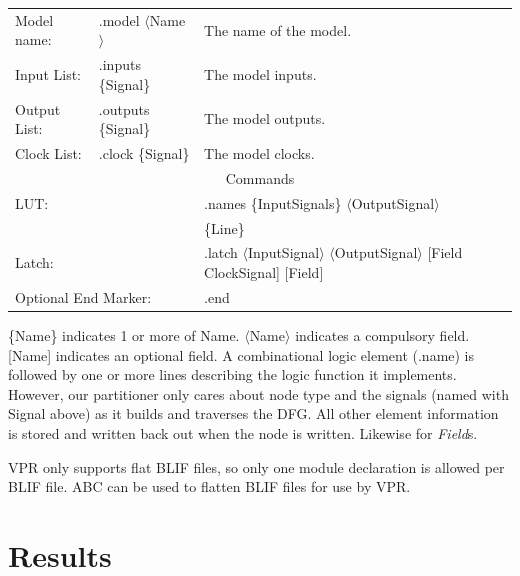 \documentclass[12pt,final,oneside]{dwThesis} %
\begin{document}
   \begin{tabular}{lll}
      Model name: & .model $\langle$Name$\rangle$ & The name of the model.\\
      Input List: & .inputs \{Signal\} & The model inputs.\\
      Output List:& .outputs \{Signal\} & The model outputs.\\
      Clock List: & .clock \{Signal\} & The model clocks.\\
      \multicolumn{3}{c}{Commands}\\
      \multicolumn{2}{l}{\gls{LUT}:} & .names \{InputSignals\} $\langle$OutputSignal$\rangle$\\
      &&\{Line\}\\
      \multicolumn{2}{l}{Latch:} & .latch $\langle$InputSignal$\rangle$ $\langle$OutputSignal$\rangle$ [Field ClockSignal] [Field]\\
      \multicolumn{2}{l}{Optional End Marker:} & .end
   \end{tabular}

   \{Name\} indicates 1 or more of Name. $\langle$Name$\rangle$ indicates a compulsory field. [Name] indicates an optional field.
   A combinational logic element (.name) is followed by one or more lines describing the logic function it implements. However, our partitioner only cares about node type and the signals (named with Signal above) as it builds and traverses the \gls{DFG}. All other element information is stored and written back out when the node is written. Likewise for \textit{Field}s.

   \gls{VPR} only supports flat \gls{BLIF} files, so only one module declaration is allowed per \gls{BLIF} file. \gls{ABC} can be used to flatten \gls{BLIF} files for use by \gls{VPR}.

   \chapter{Results}
\end{document}
